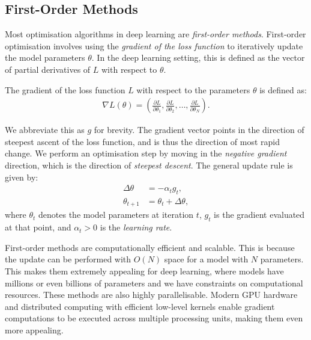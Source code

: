 \subsection{First-Order Methods}
\label{ssec:first_order_methods}

Most optimisation algorithms in deep learning are \textit{first-order methods}. First-order optimisation involves using the \textit{gradient of the loss function} to iteratively update the model parameters $\theta$. In the deep learning setting, this is defined as the vector of partial derivatives of $L$ with respect to $\theta$.
\begin{definition}
    The gradient of the loss function $L$ with respect to the parameters $\theta$ is defined as:
    \begin{align}
        \nabla L(\theta) = \left(\frac{\partial L}{\partial \theta_1}, \frac{\partial L}{\partial \theta_2}, \ldots, \frac{\partial L}{\partial \theta_N}\right).
    \end{align}
\end{definition}

We abbreviate this as $g$ for brevity. The gradient vector points in the direction of steepest ascent of the loss function, and is thus the direction of most rapid change. We perform an optimisation step by moving in the \textit{negative gradient} direction, which is the direction of \textit{steepest descent}. The general update rule is given by:
\begin{align}
    \Delta \theta &= - \alpha_t g_t, \\
    \theta_{t+1} &= \theta_t + \Delta \theta,
    \label{equation:first_order_update}
\end{align}
where $\theta_t$ denotes the model parameters at iteration $t$, $g_t$ is the gradient evaluated at that point, and $\alpha_t > 0$ is the \textit{learning rate}. 

First-order methods are computationally efficient and scalable. This is because the update can be performed with $O(N)$ space for a model with $N$ parameters. This makes them extremely appealing for deep learning, where models have millions or even billions of parameters and we have constraints on computational resources. These methods are also highly parallelisable. Modern GPU hardware and distributed computing with efficient low-level kernels enable gradient computations to be executed across multiple processing units, making them even more appealing.

